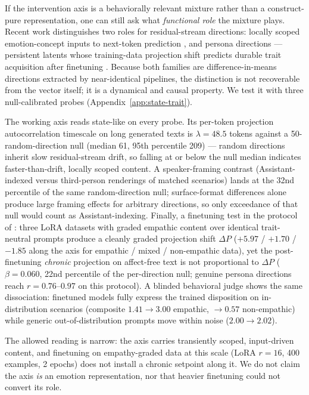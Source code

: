 \documentclass[10pt,twocolumn]{article}
\begin{document}
If the intervention axis is a behaviorally relevant mixture rather than a
construct-pure representation, one can still ask what \emph{functional role}
the mixture plays. Recent work distinguishes two roles for residual-stream
directions: locally scoped emotion-concept inputs to next-token prediction
\cite{sofroniew2026emotion}, and persona directions --- persistent latents
whose training-data projection shift predicts durable trait acquisition after
finetuning \cite{chen2025persona}. Because both families are difference-in-means
directions extracted by near-identical pipelines, the distinction is not
recoverable from the vector itself; it is a dynamical and causal property. We
test it with three null-calibrated probes (Appendix~\ref{app:state-trait}).

The working axis reads state-like on every probe. Its per-token projection
autocorrelation timescale on long generated texts is $\lambda = 48.5$ tokens
against a 50-random-direction null (median 61, 95th percentile 209) --- random
directions inherit slow residual-stream drift, so falling at or below the null
median indicates faster-than-drift, locally scoped content. A speaker-framing
contrast (Assistant-indexed versus third-person renderings of matched
scenarios) lands at the 32nd percentile of the same random-direction null;
surface-format differences alone produce large framing effects for arbitrary
directions, so only exceedance of that null would count as Assistant-indexing.
Finally, a finetuning test in the protocol of \cite{chen2025persona}: three
LoRA datasets with graded empathic content over identical trait-neutral
prompts produce a cleanly graded projection shift $\Delta P$
($+5.97$ / $+1.70$ / $-1.85$ along the axis for empathic / mixed /
non-empathic data), yet the post-finetuning \emph{chronic}
projection on affect-free text is not proportional to $\Delta P$
($\beta = 0.060$, 22nd percentile of the per-direction null; genuine persona
directions reach $r = 0.76$--$0.97$ on this protocol). A blinded behavioral
judge shows the same dissociation: finetuned models fully express the trained
disposition on in-distribution scenarios (composite $1.41 \to 3.00$ empathic,
$\to 0.57$ non-empathic) while generic out-of-distribution prompts move
within noise ($2.00 \to 2.02$).

The allowed reading is narrow: the axis carries transiently scoped,
input-driven content, and finetuning on empathy-graded data at this scale
(LoRA $r{=}16$, 400 examples, 2 epochs) does not install a chronic setpoint
along it. We do not claim the axis \emph{is} an emotion representation, nor
that heavier finetuning could not convert its role.
\end{document}
